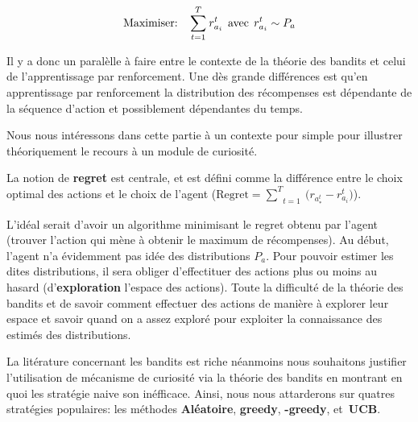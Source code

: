 $$
    \text{Maximiser: \: } \underset{t=1}{\overset{T}{\sum}}\:r^t_{a_i} \:\: \text{avec} \:\: r^t_{a_i}\sim P_a
$$

Il y a donc un paralèlle à faire entre le contexte de la théorie des bandits et celui de l'apprentissage par renforcement. Une dès grande différences est qu'en apprentissage par renforcement la distribution des récompenses est dépendante de la séquence d'action et possiblement dépendantes du temps. 

Nous nous intéressons dans cette partie à un contexte pour simple pour illustrer théoriquement le recours à un module de curiosité.

La notion de \textbf{regret} est centrale, et est défini comme la différence entre le choix optimal des actions et le choix de l'agent ($\text{Regret} = \underset{t=1}{\overset{T}{\sum}}\: \big( r_a_*^t - r^t_{a_i} \big) $).

L'idéal serait d'avoir un algorithme minimisant le regret obtenu par l'agent (trouver l'action qui mène à obtenir le maximum de récompenses). Au début, l'agent n'a évidemment pas idée des distributions $P_a$. Pour pouvoir estimer les dites distributions, il sera obliger d'effectituer des actions plus ou moins au hasard (d'\textbf{exploration} l'espace des actions). Toute la difficulté de la théorie des bandits et de savoir comment effectuer des actions de manière à explorer leur espace et savoir quand on a assez exploré pour exploiter la connaissance des estimés des distributions. 

La litérature concernant les bandits est riche néanmoins nous souhaitons justifier l'utilisation de mécanisme de curiosité via la théorie des bandits en montrant en quoi les stratégie naive son inéfficace. Ainsi, nous nous attarderons sur quatres stratégies populaires: les méthodes \textbf{Aléatoire}, \textbf{greedy}, \bm{\epsilon}\textbf{-greedy}, et\ \textbf{UCB}.

